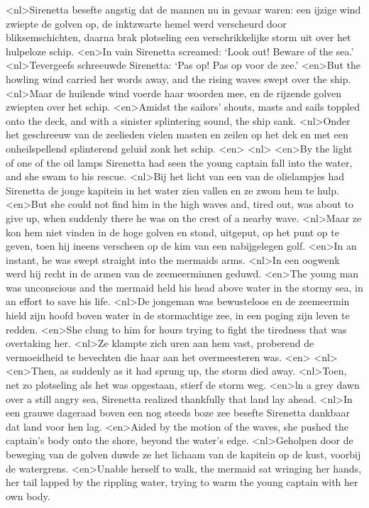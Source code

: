 <nl>Sirenetta besefte angstig dat de mannen nu in gevaar waren: een ijzige wind zwiepte de golven op, de inktzwarte hemel werd verscheurd door bliksemschichten, daarna brak plotseling een verschrikkelijke storm uit over het hulpeloze schip.
<en>In vain Sirenetta screamed: `Look out! Beware of the sea.'
<nl>Tevergeefs schreeuwde Sirenetta: `Pas op! Pas op voor de zee.'
<en>But the howling wind carried her words away, and the rising waves swept over the ship.
<nl>Maar de huilende wind voerde haar woorden mee, en de rijzende golven zwiepten over het schip.
<en>Amidst the sailors’ shouts, masts and sails toppled onto the deck, and with a sinister splintering sound, the ship sank.
<nl>Onder het geschreeuw van de zeelieden vielen masten en zeilen op het dek en met een onheilspellend splinterend geluid zonk het schip.
<en>
<nl>
<en>By the light of one of the oil lamps Sirenetta had seen the young captain fall into the water, and she swam to his rescue.
<nl>Bij het licht van een van de olielampjes had Sirenetta de jonge kapitein in het water zien vallen en ze zwom hem te hulp.
<en>But she could not find him in the high waves and, tired out, was about to give up, when suddenly there he was on the crest of a nearby wave.
<nl>Maar ze kon hem niet vinden in de hoge golven en stond, uitgeput, op het punt op te geven, toen hij ineens verscheen op de kim van een nabijgelegen golf.
<en>In an instant, he was swept straight into the mermaids arms.
<nl>In een oogwenk werd hij recht in de armen van de zeemeerminnen geduwd.
<en>The young man was unconscious and the mermaid held his head above water in the stormy sea, in an effort to save his life.
<nl>De jongeman was bewusteloos en de zeemeermin hield zijn hoofd boven water in de stormachtige zee, in een poging zijn leven te redden.
<en>She clung to him for hours trying to fight the tiredness that was overtaking her.
<nl>Ze klampte zich uren aan hem vast,  proberend de vermoeidheid te bevechten  die haar aan het overmeesteren was.
<en>
<nl>
<en>Then, as suddenly as it had sprung up, the storm died away.
<nl>Toen, net zo plotseling als het was opgestaan, stierf de storm weg.
<en>ln a grey dawn over a still angry sea, Sirenetta realized thankfully that land lay ahead.
<nl>In een grauwe dageraad boven een nog steeds boze zee besefte Sirenetta dankbaar dat land voor hen lag.
<en>Aided by the motion of the waves, she pushed the captain’s body onto the shore, beyond the water’s edge.
<nl>Geholpen door de beweging van de golven duwde ze het lichaam van de kapitein op  de kust, voorbij de watergrens.
<en>Unable herself to walk, the mermaid sat wringing her hands, her tail lapped by the rippling water, trying to warm the young captain with her own body.
